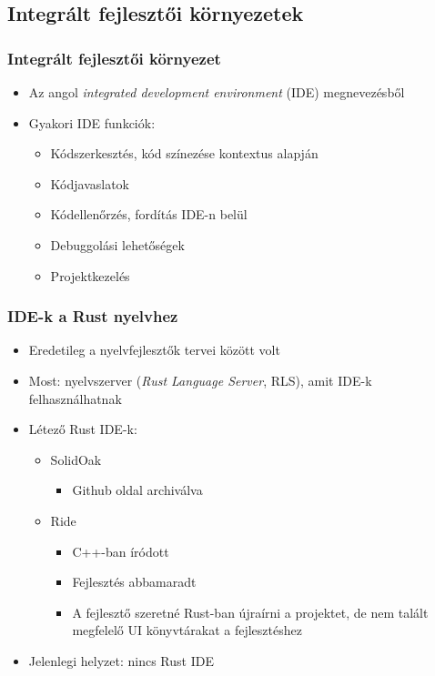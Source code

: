 \documentclass{beamer}
\begin{document}
    \subsection{Integrált fejlesztői környezetek}

    \begin{frame}[fragile]
        \frametitle{Integrált fejlesztői környezet}

        \begin{itemize}
            \item Az angol \emph{integrated development environment} (IDE) megnevezésből
            \item Gyakori IDE funkciók: \begin{itemize}
                \item Kódszerkesztés, kód színezése kontextus alapján
                \item Kódjavaslatok
                \item Kódellenőrzés, fordítás IDE-n belül
                \item Debuggolási lehetőségek
                \item Projektkezelés
            \end{itemize}
        \end{itemize}

    \end{frame}

    \begin{frame}[fragile]
        \frametitle{IDE-k a Rust nyelvhez}

        \begin{itemize}
            \item Eredetileg a nyelvfejlesztők tervei között volt
            \item Most: nyelvszerver (\emph{Rust Language Server}, RLS), amit IDE-k felhasználhatnak
            \item Létező Rust IDE-k: \begin{itemize}
                \item SolidOak \begin{itemize}
                    \item Github oldal archiválva
                \end{itemize}
                \item Ride \begin{itemize}
                    \item C++-ban íródott 
                    \item Fejlesztés abbamaradt
                    \item A fejlesztő szeretné Rust-ban újraírni a projektet, de nem talált megfelelő UI könyvtárakat a fejlesztéshez
                \end{itemize}
            \end{itemize}
            \item Jelenlegi helyzet: nincs Rust IDE
        \end{itemize}

    \end{frame}
\end{document}
